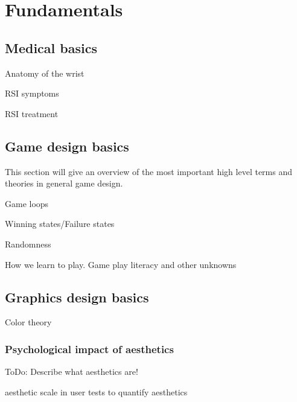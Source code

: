 \chapter{Fundamentals}
\label{sec:fundamentals}

\section{Medical basics}

Anatomy of the wrist

\gls{RSI} symptoms

\gls{RSI} treatment

\section{Game design basics}

This section will give an overview of the most important high level terms and theories in general game design.

Game loops

Winning states/Failure states

Randomness

How we learn to play. Game play literacy and other unknowns


\section{Graphics design basics}

Color theory

\subsection{Psychological impact of aesthetics}

ToDo: Describe what aesthetics are!

aesthetic scale in user tests to quantify aesthetics

